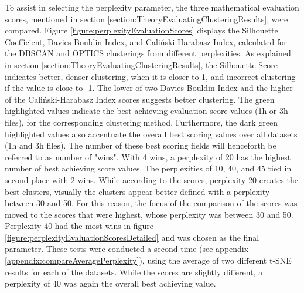 To assist in selecting the perplexity parameter, the three mathematical evaluation scores, mentioned in section \ref{section:TheoryEvaluatingClusteringResults}, were compared. Figure \ref{figure:perplexityEvaluationScores} displays the Silhouette Coefficient, Davies-Bouldin Index, and Caliński-Harabasz Index, calculated for the DBSCAN and OPTICS clusterings from different perplexities. As explained in section \ref{section:TheoryEvaluatingClusteringResults}, the Silhouette Score indicates better, denser clustering, when it is closer to 1, and incorrect clustering if the value is close to -1. The lower of two Davies-Bouldin Index and the higher of the Caliński-Harabasz Index scores suggests better clustering. The green highlighted values indicate the best achieving evaluation score values (1h or 3h files), for the corresponding clustering method. Furthermore, the dark green highlighted values also accentuate the overall best scoring values over all datasets (1h and 3h files).
The number of these best scoring fields will henceforth be referred to as number of "wins". With 4 wins, a perplexity of 20 has the highest number of best achieving score values. The perplexities of 10, 40, and 45 tied in second place with 2 wins. While according to the scores, perplexity 20 creates the best clusters, visually the clusters appear better defined with a perplexity between 30 and 50. For this reason, the focus of the comparison of the scores was moved to the scores that were highest, whose perplexity was between 30 and 50. Perplexity 40 had the most wins in figure \ref{figure:perplexityEvaluationScoresDetailed} and was chosen as the final parameter. These tests were conducted a second time (see appendix \ref{appendix:compareAveragePerplexity}), using the average of two different t-SNE results for each of the datasets. While the scores are slightly different, a perplexity of 40 was again the overall best achieving value.

